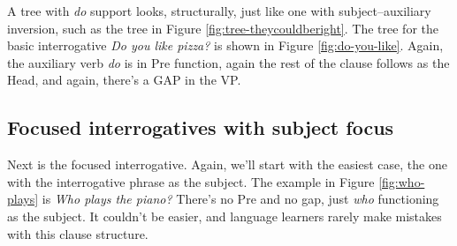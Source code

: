 A tree with \textit{do} support looks, structurally, just like one with subject--auxiliary inversion, such as the tree in Figure \ref{fig:tree-theycouldberight}. The tree for the basic interrogative \textit{Do you like pizza?} is shown in Figure \ref{fig:do-you-like}. Again, the auxiliary verb \textit{do} is in \textsf{Pre} function, again the rest of the clause follows as the \textsf{Head}, and again, there's a GAP in the VP.



\subsection{Focused interrogatives with subject focus}

Next is the focused interrogative. Again, we'll start with the easiest case, the one with the interrogative phrase as the subject. The example in Figure \ref{fig:who-plays} is \textit{Who plays the piano?} There's no \textsf{Pre} and no gap, just \textit{who} functioning as the subject. It couldn't be easier, and language learners rarely make mistakes with this clause structure.


